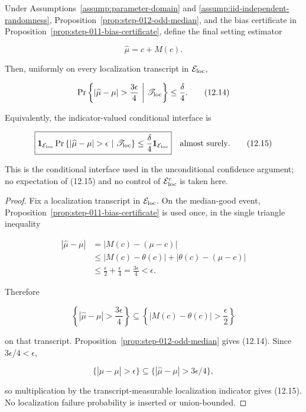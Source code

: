 \begin{proposition}\label{prop:step-012-conditional-target}
Under Assumptions~\ref{assump:parameter-domain} and
\ref{assump:iid-independent-randomness},
Proposition~\ref{prop:step-012-odd-median}, and the bias certificate in
Proposition~\ref{prop:step-011-bias-certificate}, define the final
setting estimator

\[
\widehat\mu=c+M(c).
\]

Then, uniformly on every localization transcript in
\(\mathcal E_{\rm loc}\),

\[
\Pr\left\{
|\widehat\mu-\mu|>\frac{3\epsilon}{4}
\ \middle|\ \mathscr T_{\rm loc}
\right\}
\leq\frac{\delta}{4}.
\tag{12.14}
\]

Equivalently, the indicator-valued conditional interface is

\[
\boxed{
\mathbf1_{\mathcal E_{\rm loc}}
\Pr\left\{|\widehat\mu-\mu|>\epsilon
\ \middle|\ \mathscr T_{\rm loc}\right\}
\leq\frac{\delta}{4}\mathbf1_{\mathcal E_{\rm loc}}
}
\quad\text{almost surely}.
\tag{12.15}
\]

This is the conditional interface used in the unconditional confidence argument; no expectation of (12.15) and no control of
\(\mathcal E_{\rm loc}^c\) is taken here.
\end{proposition}

\begin{proof}
Fix a localization transcript in
\(\mathcal E_{\rm loc}\). On the median-good event, Proposition~\ref{prop:step-011-bias-certificate} is used once, in the
single triangle inequality

\[
\begin{aligned}
|\widehat\mu-\mu|
&=|M(c)-(\mu-c)|\\
&\leq|M(c)-\theta(c)|
   +|\theta(c)-(\mu-c)|\\
&\leq\frac{\epsilon}{2}+\frac{\epsilon}{4}
=\frac{3\epsilon}{4}
<\epsilon.
\end{aligned}
\tag{12.16}
\]

Therefore

\[
\left\{|\widehat\mu-\mu|>\frac{3\epsilon}{4}\right\}
\subseteq
\left\{|M(c)-\theta(c)|>\frac{\epsilon}{2}\right\}
\]

on that transcript. Proposition~\ref{prop:step-012-odd-median} gives
(12.14). Since \(3\epsilon/4<\epsilon\),

\[
\{|\widehat\mu-\mu|>\epsilon\}
\subseteq
\{|\widehat\mu-\mu|>3\epsilon/4\},
\]

so multiplication by the transcript-measurable localization indicator gives
(12.15). No localization failure probability is inserted or union-bounded.
\end{proof}

